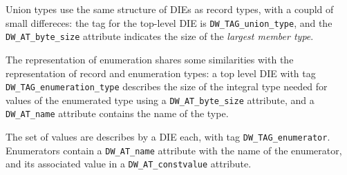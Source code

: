 
Union types use the same structure of DIEs as record types, with a coupld of
small differeces: the tag for the top-level DIE is \verb|DW_TAG_union_type|,
and the \verb|DW_AT_byte_size| attribute indicates the size of the
\emph{largest member type}.



The representation of enumeration shares some similarities with the
representation of record and enumeration types: a top level DIE with tag
\verb|DW_TAG_enumeration_type| describes the size of the integral type needed
for values of the enumerated type using a \verb|DW_AT_byte_size| attribute,
and a \verb|DW_AT_name| attribute contains the name of the type.

The set of values are describes by a DIE each, with tag
\verb|DW_TAG_enumerator|. Enumerators contain a \verb|DW_AT_name| attribute
with the name of the enumerator, and its associated value in
a \verb|DW_AT_constvalue| attribute.



